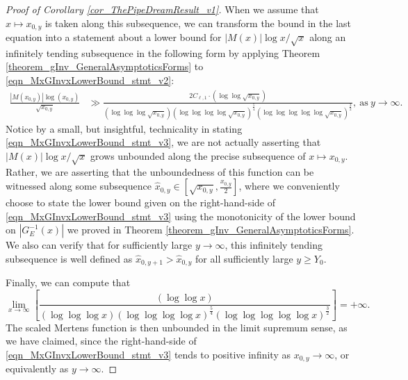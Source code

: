 \documentclass[11pt,reqno,a4letter]{article}
\numberwithin{figure}{section}
\numberwithin{table}{section}
\theoremstyle{plain}
\numberwithin{theorem}{section}
\theoremstyle{definition}
\begin{document}
\begin{proof}[Proof of Corollary \ref{cor_ThePipeDreamResult_v1}]
When we assume that $x \mapsto x_{0,y}$ is taken along this subsequence, 
we can transform the bound in the last 
equation into a statement about a lower bound for $|M(x)| \log x / \sqrt{x}$ 
along an infinitely tending subsequence in the following form by 
applying Theorem \ref{theorem_gInv_GeneralAsymptoticsForms} to 
\eqref{eqn_MxGInvxLowerBound_stmt_v2}: 
\begin{align} 
\label{eqn_MxGInvxLowerBound_stmt_v3} 
\frac{|M(x_{0,y})| \log(x_{0,y})}{\sqrt{x_{0,y}}} & \gg 
     \frac{2 C_{\ell,1} \cdot (\log\log \sqrt{x_{0,y}})}{ 
     (\log\log\log \sqrt{x_{0,y}}) (\log\log\log\log \sqrt{x_{0,y}})^{\frac{5}{4}} 
     (\log\log\log\log\log \sqrt{x_{0,y}})^{\frac{3}{2}}}, 
     \mathrm{\ as\ } y \rightarrow \infty. 
\end{align} 
Notice by a small, but insightful, 
technicality in stating \eqref{eqn_MxGInvxLowerBound_stmt_v3}, 
we are not actually asserting that 
$|M(x)| \log x / \sqrt{x}$ grows unbounded along the precise subsequence of 
$x \mapsto x_{0,y}$. Rather, we are asserting that the unboundedness of this function 
can be witnessed along some subsequence 
$\hat{x}_{0,y} \in \left[\sqrt{x_{0,y}}, \frac{x_{0,y}}{2}\right]$, where we conveniently 
choose to state the lower bound given on the right-hand-side of 
\eqref{eqn_MxGInvxLowerBound_stmt_v3} using the 
monotonicity of the lower bound on $|G_E^{-1}(x)|$ we proved in 
Theorem \ref{theorem_gInv_GeneralAsymptoticsForms}. 
We also can verify that for sufficiently large $y \rightarrow \infty$, this infinitely 
tending subsequence is well defined as $\hat{x}_{0,y+1} > \hat{x}_{0,y}$ for all 
sufficiently large $y \geq Y_0$. 

Finally, we can compute that 
\[
\lim_{x \rightarrow \infty} \left[\frac{(\log\log x)}{ 
     (\log\log\log x) (\log\log\log\log x)^{\frac{5}{4}} 
     (\log\log\log\log\log x)^{\frac{3}{2}}}  
     \right] = +\infty. 
\]
The scaled Mertens function is then 
unbounded in the limit supremum sense, as we have claimed, since the right-hand-side of 
\eqref{eqn_MxGInvxLowerBound_stmt_v3} tends to positive infinity as 
$x_{0,y} \rightarrow \infty$, or equivalently as $y \rightarrow \infty$. 
\end{proof} 

\newpage 
\renewcommand{\refname}{References} 
{}


\newpage
\setcounter{section}{0} 
\renewcommand{\thesection}{T.\arabic{section}} 

\newpage
\end{document}
